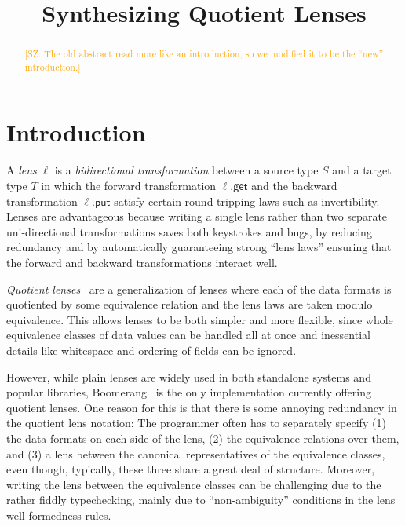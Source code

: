 \documentclass{svproc}
\newcommand{\FINISH}[3]{\ifdraft\textcolor{#1}{[#2: #3]}\fi}
\newcommand{\saz}[1]{\FINISH{orange}{SZ}{#1}}
\newcommand{\kw}[1]{\ensuremath{\mathsf{#1}}}
\newcommand{\get}{\ensuremath{\kw{get}}}
\newcommand{\lput}{\ensuremath{\kw{put}}}
\begin{document}
\mainmatter              %
%
\title{Synthesizing Quotient Lenses}
%
%
\author{}
%
\authorrunning{} %
%
\tocauthor{}
%
\institute{}

\maketitle              %

\begin{abstract} 
\saz{The old abstract read more like an introduction, so we modified it to be
  the ``new'' introduction.}
\end{abstract}

\section{Introduction}
A {\em lens} $\ell$ is a {\em bidirectional transformation} between a source
type $S$ and a target type $T$ in which the forward transformation
$\ell.\get$ and the backward transformation $\ell.\lput$ satisfy certain
round-tripping laws such as invertibility. Lenses are advantageous
because writing a single lens rather than two separate uni-directional
transformations saves both keystrokes and bugs, by reducing redundancy and by
automatically guaranteeing strong ``lens laws'' ensuring that the forward and
backward transformations interact well.  

{\em Quotient lenses}~\cite{quotientlenses} are a generalization of lenses
where each of the data formats is quotiented by some equivalence relation
and the lens laws are taken modulo equivalence.  This allows lenses to be
both simpler and more flexible, since whole equivalence classes of data
values can be handled all at once and inessential details like whitespace
and ordering of fields can be ignored.

However, while plain lenses are widely used in both standalone systems and
popular libraries, Boomerang~\cite{Boomerang} is the only implementation
currently offering quotient lenses.  One reason for this is that there is
some annoying redundancy in the quotient lens notation: The programmer often
has to separately specify (1) the data formats on each side of the lens, (2) the
equivalence relations over them, and (3) a lens between the canonical
representatives of the equivalence classes, even though, typically, these three
share a great deal of structure.  Moreover, writing the lens between the
equivalence classes can be challenging due to the rather fiddly typechecking, mainly due to
``non-ambiguity'' conditions in the lens well-formedness rules.
\end{document}
